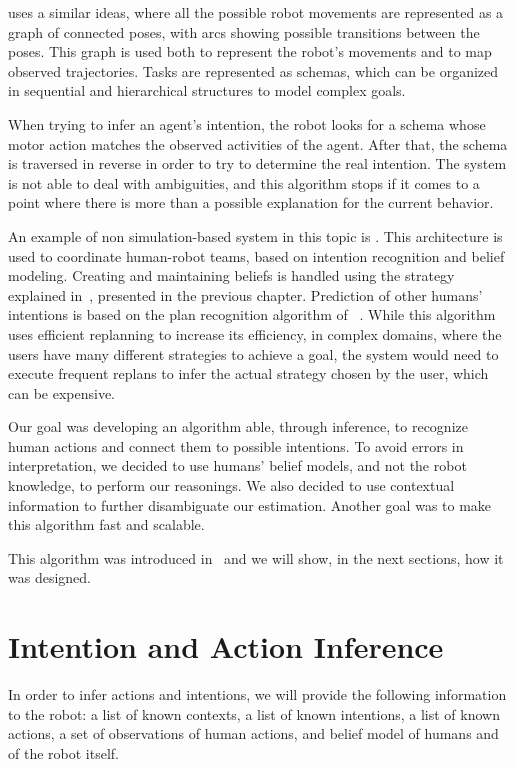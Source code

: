 \cite{BreazealGB09} uses a similar ideas, where all the possible robot movements are represented as a graph of connected poses, with arcs showing possible transitions between the poses. This graph is used both to represent the robot's movements and to map observed trajectories. Tasks are represented as schemas, which can be organized in sequential and hierarchical structures to model complex goals.

 When trying to infer an agent's intention, the robot looks for a schema whose motor action matches the observed activities of the agent. After that, the schema is traversed in reverse in order to try to determine the real intention. The system is not able to deal with ambiguities, and this algorithm stops if it comes to a point where there is more than a possible explanation for the current behavior. 

An example of non simulation-based system in this topic is \cite{talamadupula2014coordination}. This architecture is used to coordinate human-robot teams, based on intention recognition and belief modeling. Creating and maintaining beliefs is handled using the strategy explained in~\cite{scheutz2013computational}, presented in the previous chapter. Prediction of other humans' intentions is based on the plan recognition algorithm of ~\cite{ramirez2009plan}. While this algorithm uses efficient replanning to increase its efficiency, in complex domains, where the users have many different strategies to achieve a goal, the system would need to execute frequent replans to infer the actual strategy chosen by the user, which can be expensive.

Our goal was developing an algorithm able, through inference, to recognize human actions and connect them to possible intentions. To avoid errors in interpretation, we decided to use humans' belief models, and not the robot knowledge, to perform our reasonings. We also decided to use contextual information to further disambiguate our estimation. Another goal was to make this algorithm fast and scalable. 

This algorithm was introduced in~\cite{devin2016some} and we will show, in the next sections, how it was designed. 

\section{Intention and Action Inference}
\label{sec:intention-intention_recognition}
In order to infer actions and intentions, we will provide the following information to the robot: a list of known contexts, a list of known intentions, a list of known actions, a set of observations of human actions, and belief model of humans and of the robot itself.

